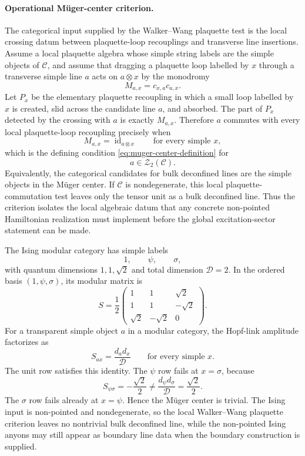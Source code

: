 \paragraph{Operational M\"uger-center criterion.}
\label{par:muger-center-plaquette-criterion}
The categorical input supplied by the Walker--Wang plaquette test is the
local crossing datum between plaquette-loop recouplings and transverse line
insertions.  Assume a local plaquette algebra whose simple string labels are
the simple objects of \(\mathcal C\), and assume that dragging a plaquette
loop labelled by \(x\) through a transverse simple line \(a\) acts on
\(a\otimes x\) by the monodromy
\[
  M_{a,x}=c_{x,a}c_{a,x}.
\]
Let \(P_x\) be the elementary plaquette recoupling in which a small loop
labelled by \(x\) is created, slid across the candidate line \(a\), and
absorbed.  The part of \(P_x\) detected by the crossing with \(a\) is exactly
\(M_{a,x}\).  Therefore \(a\) commutes with every local plaquette-loop
recoupling precisely when
\[
  M_{a,x}=\operatorname{id}_{a\otimes x}
  \qquad\text{for every simple }x,
\]
which is the defining condition
\eqref{eq:muger-center-definition} for
\[
  a\in\mathcal Z_2(\mathcal C).
\]
Equivalently, the categorical candidates for bulk deconfined lines are the
simple objects in the M\"uger center.  If \(\mathcal C\) is nondegenerate,
this local plaquette-commutation test leaves only the tensor unit as a bulk
deconfined line.  Thus the criterion isolates the local algebraic datum that
any concrete non-pointed Hamiltonian realization must implement before the
global excitation-sector statement can be made.

\begin{example}
\label{ex:ising-muger-center-check}
The Ising modular category has simple labels
\[
  1,\qquad \psi,\qquad \sigma,
\]
with quantum dimensions \(1,1,\sqrt2\) and total dimension
\(\mathcal D=2\).  In the ordered basis \((1,\psi,\sigma)\), its modular
matrix is
\[
  S=\frac12
  \begin{pmatrix}
    1&1&\sqrt2\\
    1&1&-\sqrt2\\
    \sqrt2&-\sqrt2&0
  \end{pmatrix}.
\]
For a transparent simple object \(a\) in a modular category, the Hopf-link
amplitude factorizes as
\begin{equation}
  S_{ax}=\frac{d_a d_x}{\mathcal D}
  \qquad\text{for every simple }x .
  \label{eq:transparent-s-row-factorization}
\end{equation}
The unit row satisfies this identity.  The \(\psi\) row fails at
\(x=\sigma\), because
\[
  S_{\psi\sigma}=-\frac{\sqrt2}{2}
  \ne
  \frac{d_\psi d_\sigma}{\mathcal D}
  =
  \frac{\sqrt2}{2}.
\]
The \(\sigma\) row fails already at \(x=\psi\).  Hence the M\"uger center is
trivial.  The Ising input is non-pointed and nondegenerate, so the local
Walker--Wang plaquette criterion leaves no nontrivial bulk deconfined line,
while the non-pointed Ising anyons may still appear as boundary line data
when the boundary construction is supplied.
\end{example}

